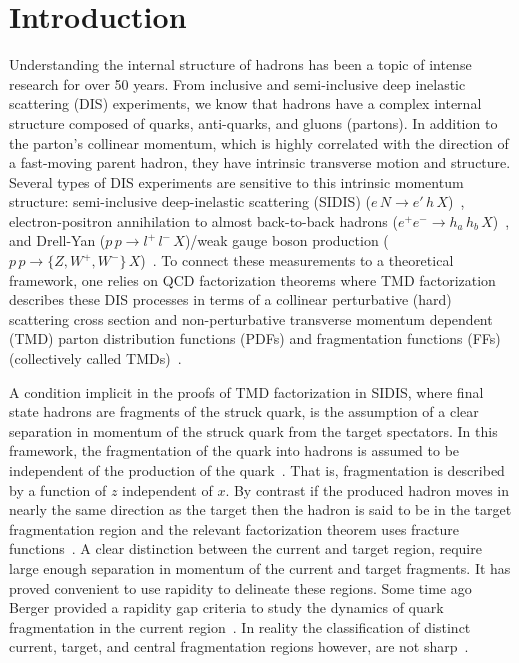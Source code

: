 \documentclass[final,3p,times,onecolumn,sort&compress,hidelinks]{elsarticle}
\begin{document}
\date{\today}



\section{Introduction}
\label{s:intro}
Understanding the internal structure of hadrons has been a topic of intense research for over 50 years.  From inclusive and semi-inclusive deep inelastic scattering (DIS) experiments, we know that hadrons  have a complex internal structure
composed of quarks, anti-quarks, and gluons (partons). In addition to the parton's  collinear momentum, which is highly correlated  with the direction of a fast-moving parent hadron, they 
have intrinsic transverse motion and structure. Several types of DIS experiments are sensitive to this intrinsic momentum structure: semi-inclusive deep-inelastic scattering (SIDIS) ($e\,N\to e'\,h\,X$)~\cite{Kotzinian:1994dv}, electron-positron annihilation to almost back-to-back hadrons ($e^+e^-\to h_a\,h_b\,X$)~\cite{Boer:1997mf}, and Drell-Yan ($p\,p\to l^+\,l^-\,X$)/weak gauge boson production ($p\,p\to \{Z, W^+, W^-\}\,X$)~\cite{Tangerman:1994eh}. To connect these measurements  to a theoretical framework, 
one relies on QCD factorization theorems where
TMD factorization~\cite{Collins:1981uw,Ji:2004wu,Collins:2011zzd}
describes these DIS processes in terms of  a collinear perturbative (hard) scattering cross section and  non-perturbative 
transverse momentum dependent (TMD)
 parton distribution functions (PDFs) and fragmentation functions (FFs) (collectively called TMDs)~\cite{Kotzinian:1994dv,Mulders:1995dh,Boer:1997nt}. 

 
 A condition implicit in the proofs of TMD factorization in SIDIS,
 where final state hadrons are   fragments of the
 struck quark, is the assumption of  a clear separation in momentum of the struck quark from the target spectators. In this framework,  the fragmentation of the quark into hadrons is assumed to be independent of the production of the quark~\cite{Berger:1987zu,Trentadue:1993ka}. That is, 
 fragmentation is described by a function of $z$ independent of $x$.  By contrast if the produced hadron moves in nearly the same direction as the target then the hadron is said to be in the target fragmentation region and the relevant factorization theorem uses fracture functions~\cite{Trentadue:1993ka,Grazzini:1997ih,Anselmino:2011ss}.   A clear distinction between the current and target  region, require large enough separation in momentum of the current and target fragments.  It has proved  convenient to use rapidity to delineate these regions.   Some time ago Berger provided a rapidity gap criteria  to study the dynamics of quark fragmentation in the current region~\cite{Berger:1987zu,Mulders:2000jt}.  In reality the classification of distinct current, target, and central fragmentation regions however, are not sharp~\cite{Berger:1987zu,Mulders:2000jt,Joosten:2013mia,Boglione:2016bph,Collins:2018teg}.
\end{document}

